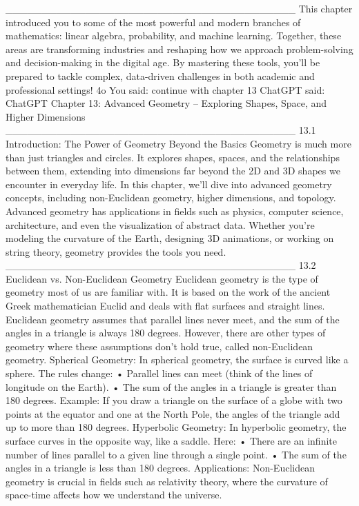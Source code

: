 ________________________________________
This chapter introduced you to some of the most powerful and modern branches of mathematics: linear algebra, probability, and machine learning. Together, these areas are transforming industries and reshaping how we approach problem-solving and decision-making in the digital age. By mastering these tools, you’ll be prepared to tackle complex, data-driven challenges in both academic and professional settings!
4o
You said:
continue with chapter 13
ChatGPT said:
ChatGPT
Chapter 13: Advanced Geometry – Exploring Shapes, Space, and Higher Dimensions
________________________________________
13.1 Introduction: The Power of Geometry Beyond the Basics
Geometry is much more than just triangles and circles. It explores shapes, spaces, and the relationships between them, extending into dimensions far beyond the 2D and 3D shapes we encounter in everyday life. In this chapter, we’ll dive into advanced geometry concepts, including non-Euclidean geometry, higher dimensions, and topology.
Advanced geometry has applications in fields such as physics, computer science, architecture, and even the visualization of abstract data. Whether you're modeling the curvature of the Earth, designing 3D animations, or working on string theory, geometry provides the tools you need.
________________________________________
13.2 Euclidean vs. Non-Euclidean Geometry
Euclidean geometry is the type of geometry most of us are familiar with. It is based on the work of the ancient Greek mathematician Euclid and deals with flat surfaces and straight lines. Euclidean geometry assumes that parallel lines never meet, and the sum of the angles in a triangle is always 180 degrees.
However, there are other types of geometry where these assumptions don’t hold true, called non-Euclidean geometry.
Spherical Geometry:
In spherical geometry, the surface is curved like a sphere. The rules change:
•	Parallel lines can meet (think of the lines of longitude on the Earth).
•	The sum of the angles in a triangle is greater than 180 degrees.
Example: If you draw a triangle on the surface of a globe with two points at the equator and one at the North Pole, the angles of the triangle add up to more than 180 degrees.
Hyperbolic Geometry:
In hyperbolic geometry, the surface curves in the opposite way, like a saddle. Here:
•	There are an infinite number of lines parallel to a given line through a single point.
•	The sum of the angles in a triangle is less than 180 degrees.
Applications: Non-Euclidean geometry is crucial in fields such as relativity theory, where the curvature of space-time affects how we understand the universe.
